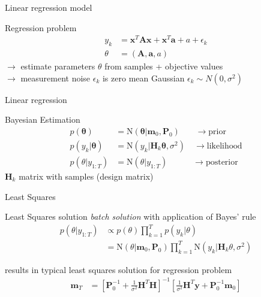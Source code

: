\documentclass[navbarinfooter, 12pt]{sdqbeamer}
\begin{document}
\begin{frame}{Linear regression model}
  \begin{block}{Regression problem}
    \begin{align*}
      y_k &=  \mathbf{x}^T \mathbf{A} \mathbf{x} + \mathbf{x}^T \mathbf{a} + a + \epsilon_k \\
      \theta &= (\mathbf{A}, \mathbf{a}, a)
   \end{align*}
   $\rightarrow$ estimate parameters $\theta$ from samples + objective values \\
   $\rightarrow$ measurement noise $\epsilon_k$ is zero mean
   Gaussian $\epsilon_k \sim N(0, \sigma^2)$
  \end{block}
\end{frame}

\begin{frame}{Linear regression}
  \begin{block}{Bayesian Estimation}
    \begin{align*}
      p(\mathbf{\theta}) &= \text{N}(\mathbf{\theta} | \textbf{m}_0, \textbf{P}_0)
      \; \; \; \quad \rightarrow \text{prior} \\      
      p(y_k | \mathbf{\theta}) &= \text{N}(y_k | \textbf{H}_k \mathbf{\theta}, \sigma^2)
                                 \quad \rightarrow  \text{likelihood} \\ 
      p(\theta | y_{1:T}) &= \text{N}(\theta | y_{1:T}) \quad \quad \quad \rightarrow \text{posterior}
  \end{align*}
  $\textbf{H}_k$ matrix with samples (design matrix)
\end{block}
\end{frame}


\begin{frame}{Least Squares}
  \begin{block}{Least Squares solution}
    \textit{batch solution} with application of Bayes' rule
    \begin{align*}
      p(\theta | y_{1:T}) &\propto p(\theta) \prod^T_{k=1} p(y_k|\theta)  \\
                          &= \text{N}(\theta | \textbf{m}_0, \textbf{P}_0)
                            \prod^T_{k=1} \text{N}(y_k | \textbf{H}_k \theta, \sigma^2)
    \end{align*}
  \end{block}
    results in typical least squares solution for regression problem \\
    \begin{align*}
      \textbf{m}_T &= [\textbf{P}_0^{-1} + \frac{1}{\sigma^2} \textbf{H}^T \textbf{H}]^{-1}
                     [\frac{1}{\sigma^2} \textbf{H}^T \textbf{y} + \textbf{P}_0^{-1} \textbf{m}_0] 
    \end{align*}

\end{frame}
\end{document}
